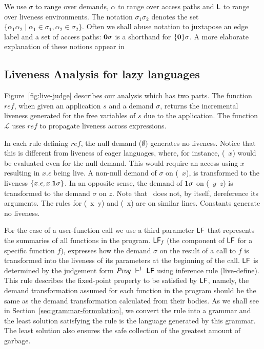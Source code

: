 \documentclass[9pt]{sigplanconf}
\begin{document}
We use $\sigma$  to range over demands, $\alpha$  to range over access
paths  and $\mathsf{L}$ to  range over  liveness environments.   The notation
$\sigma_1\sigma_2$  denotes  the  set $\lbrace  \alpha_1\alpha_2  \mid
\alpha_1 \in \sigma_1, \alpha_2  \in \sigma_2\rbrace$.  Often we shall
abuse notation to  juxtapose an edge label and a  set of access paths:
$\mathbf{0}\sigma$ is a shorthand for $\lbrace\mathbf{0}\rbrace\sigma$. A more
elaborate explanation of these notions appear in \cite{asati14lgc}


\subsection{Liveness Analysis for lazy languages}

Figure~\ref{fig:live-judge}  describes  our  analysis  which  has  two
parts. The function $\mathit{ref}$,  when given an application $s$ and
a demand $\sigma$, returns  the incremental liveness generated for the
free  variables   of  $s$  due  to  the   application.   The  function
$\mathcal{L}$  uses   $\mathit{ref}$  to  propagate   liveness  across
expressions.

 In each  rule defining $\mathit{ref}$, the  null demand ($\emptyset$)
 generates no  liveness.  Notice that this is  different from liveness
 of  eager  languages,  where,   for  instance,  (\CDR~$x$)  would  be
 evaluated  even for  the null  demand. This  would require  an access
 using $x$ resulting in  $x.\epsilon$ being live.  A non-null demand of
 $\sigma$ on (\CDR~$x$), is transformed to the liveness $\{x.\epsilon,
 x.\mathbf{1}\sigma\}$.  In an opposite  sense, the demand of $\mathbf{1}\sigma$
 on  (\CONS~$y$~$z$) is  transformed to  the demand  $\sigma$  on $z$.
 Note that \CONS\ does not,  by itself, dereference its arguments. The
 rules for (\PRIM~x~y) and  (\NULLQ~x) are on similar lines. Constants
 generate no liveness.


For  the  case  of a  user-function  call  we  use a  third  parameter
$\mathsf{LF}$  that  represents the  summaries  of  all  functions in  the
program.   $\mathsf{LF}_{\mathit f}$  (the  component of  $\mathsf{LF}$ for  a
specific  function $f$),  expresses  how the  demand  $\sigma$ on  the
result  of a  call to  $f$  is transformed  into the  liveness of  its
parameters at the  beginning of the call.  $\mathsf{LF}$  is determined by
the judgement  form $\mathit{Prog} \ \vdash^l\  \mathsf{LF}$  using inference rule
({\sc live-define}).  This rule  describes the fixed-point property to
be satisfied  by $\mathsf{LF}$, namely, the  demand transformation assumed
for each  function in  the program  should be the  same as  the demand
transformation  calculated from  their  bodies.  As  we  shall see  in
Section~\ref{sec:grammar-formulation},  we  convert  the rule  into  a
grammar and  the least  solution satisfying the  rule is  the language
generated by this  grammar.  The least solution also  ensures the safe
collection of the greatest amount of garbage.
\end{document}
